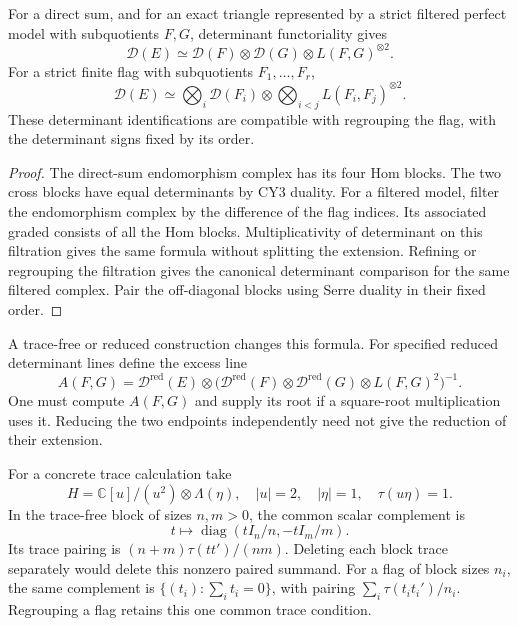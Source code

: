 \begin{proposition}
\label{prop:orientation-direct-sum-multiplicativity}
\label{prop:orientation-extension-multiplicativity}
For a direct sum, and for an exact triangle represented by a strict
filtered perfect model with subquotients \(F,G\), determinant
functoriality gives
\[
 \mathscr D(E)\simeq
 \mathscr D(F)\otimes\mathscr D(G)\otimes L(F,G)^{\otimes2}.
\]
For a strict finite flag with subquotients \(F_1,\ldots,F_r\),
\[
 \mathscr D(E)\simeq
 \bigotimes_i\mathscr D(F_i)\otimes
 \bigotimes_{i<j}L(F_i,F_j)^{\otimes2}.
\]
These determinant identifications are compatible with regrouping the
flag, with the determinant signs fixed by its order.
\end{proposition}
\begin{proof}
The direct-sum endomorphism complex has its four Hom blocks.  The two
cross blocks have equal determinants by CY3 duality.  For a filtered
model, filter the endomorphism complex by the difference of the flag
indices.  Its associated graded consists of all the Hom blocks.
Multiplicativity of determinant on this filtration gives the same
formula without splitting the extension.  Refining or regrouping the
filtration gives the canonical determinant comparison for the same
filtered complex.  Pair the off-diagonal blocks using Serre duality
in their fixed order.
\end{proof}

A trace-free or reduced construction changes this formula.  For
specified reduced determinant lines define the excess line
\[
 A(F,G)=\mathscr D^{\mathrm{red}}(E)\otimes
 \bigl(\mathscr D^{\mathrm{red}}(F)\otimes
 \mathscr D^{\mathrm{red}}(G)\otimes L(F,G)^2\bigr)^{-1}.
\]
One must compute \(A(F,G)\) and supply its root if a square-root
multiplication uses it.  Reducing the two endpoints independently
need not give the reduction of their extension.

For a concrete trace calculation take
\[
 H=\mathbb C[u]/(u^2)\otimes\Lambda(\eta),\quad |u|=2,
 \quad|\eta|=1,\quad\tau(u\eta)=1.
\]
In the trace-free block of sizes \(n,m>0\), the common scalar
complement is
\[
 t\longmapsto
 \operatorname{diag}(tI_n/n,-tI_m/m).
\]
Its trace pairing is \((n+m)\tau(tt')/(nm)\).  Deleting each block
trace separately would delete this nonzero paired summand.  For a
flag of block sizes \(n_i\), the same complement is
\(\{(t_i):\sum_i t_i=0\}\), with pairing
\(\sum_i\tau(t_it_i')/n_i\).  Regrouping a flag retains this one
common trace condition.

